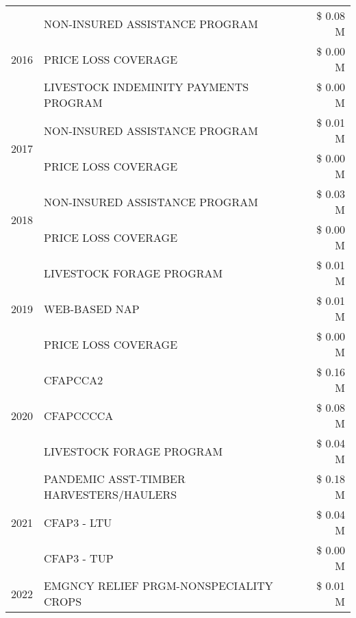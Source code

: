 \begin{tabular}{llr}
\cline{1-3}
\multirow[t]{3}{*}{2016} & NON-INSURED ASSISTANCE PROGRAM & \$ 0.08 M \\
 & PRICE LOSS COVERAGE & \$ 0.00 M \\
 & LIVESTOCK INDEMINITY PAYMENTS PROGRAM & \$ 0.00 M \\
\cline{1-3}
\multirow[t]{2}{*}{2017} & NON-INSURED ASSISTANCE PROGRAM & \$ 0.01 M \\
 & PRICE LOSS COVERAGE & \$ 0.00 M \\
\cline{1-3}
\multirow[t]{2}{*}{2018} & NON-INSURED ASSISTANCE PROGRAM & \$ 0.03 M \\
 & PRICE LOSS COVERAGE & \$ 0.00 M \\
\cline{1-3}
\multirow[t]{3}{*}{2019} & LIVESTOCK FORAGE PROGRAM & \$ 0.01 M \\
 & WEB-BASED NAP & \$ 0.01 M \\
 & PRICE LOSS COVERAGE & \$ 0.00 M \\
\cline{1-3}
\multirow[t]{3}{*}{2020} & CFAPCCA2 & \$ 0.16 M \\
 & CFAPCCCCA & \$ 0.08 M \\
 & LIVESTOCK FORAGE PROGRAM & \$ 0.04 M \\
\cline{1-3}
\multirow[t]{3}{*}{2021} & PANDEMIC ASST-TIMBER HARVESTERS/HAULERS & \$ 0.18 M \\
 & CFAP3 - LTU & \$ 0.04 M \\
 & CFAP3 - TUP & \$ 0.00 M \\
\cline{1-3}
2022 & EMGNCY RELIEF PRGM-NONSPECIALITY CROPS & \$ 0.01 M \\
\cline{1-3}
\bottomrule
\end{tabular}
